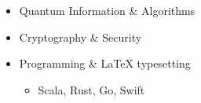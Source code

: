 \begin{frame}
\begin{columns}
\begin{column}{0.7\textwidth}
\begin{itemize}
        \item Quantum Information \& Algorithms

        \item Cryptography \& Security
        
        \item Programming \& {\LaTeX} typesetting
        \begin{itemize}
          \item Scala, Rust, Go, Swift
        \end{itemize}
      \end{itemize}
    \end{column}
  \end{columns}

\end{frame}

